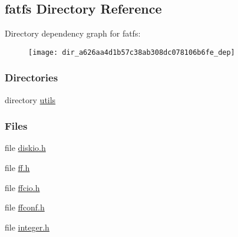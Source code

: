 \subsection{fatfs Directory Reference}
\label{dir_a626aa4d1b57c38ab308dc078106b6fe}
Directory dependency graph for fatfs\+:
\nopagebreak
\begin{figure}[H]
\begin{center}
\leavevmode
\texttt{[image: dir\_a626aa4d1b57c38ab308dc078106b6fe\_dep]}
\end{center}
\end{figure}
\subsubsection*{Directories}
\begin{DoxyCompactItemize}
\item 
directory \hyperlink{dir_6161892417ab0984eb71f252e5d2ad8e}{utils}
\end{DoxyCompactItemize}
\subsubsection*{Files}
\begin{DoxyCompactItemize}
\item 
file \hyperlink{diskio_8h}{diskio.\+h}
\item 
file \hyperlink{ff_8h}{ff.\+h}
\item 
file \hyperlink{ffcio_8h}{ffcio.\+h}
\item 
file \hyperlink{ffconf_8h}{ffconf.\+h}
\item 
file \hyperlink{integer_8h}{integer.\+h}
\end{DoxyCompactItemize}
